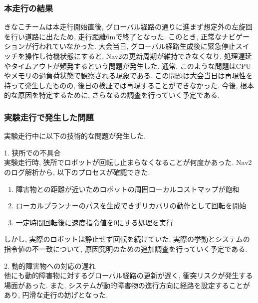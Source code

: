 \subsubsection{本走行の結果}
きなこチームは本走行開始直後, グローバル経路の通りに進まず想定外の左旋回を行い道路に出たため, 走行距離6mで終了となった. 
このとき, 正常なナビゲーションが行われていなかった. 
大会当日, グローバル経路生成後に緊急停止スイッチを操作し待機状態にすると, Nav2の更新周期が維持できなくなり, 処理遅延やタイムアウトが頻発するという問題が発生した. 
通常, このような問題はCPUやメモリの過負荷状態で観察される現象である. 
この問題は大会当日は再現性を持って発生したものの, 後日の検証では再現することができなかった. 
今後, 根本的な原因を特定するために, さらなるの調査を行っていく予定である. 

\subsubsection{実験走行で発生した問題}
実験走行中に以下の技術的な問題が発生した. 

1. 狭所での不具合\\
実験走行時, 狭所でロボットが回転し止まらなくなることが何度かあった. 
Nav2のログ解析から, 以下のプロセスが確認できた. 

\begin{enumerate}
  \item 障害物との距離が近いためロボットの周囲ローカルコストマップが飽和
  \item ローカルプランナーのパスを生成できずリカバリの動作として回転を開始
  \item  一定時間回転後に速度指令値を0にする処理を実行
\end{enumerate}

しかし, 実際のロボットは静止せず回転を続けていた. 
実際の挙動とシステムの指令値の不一致について, 原因究明のための追加調査を行っていく予定である. 

2. 動的障害物への対応の遅れ\\
他にも動的障害物に対するグローバル経路の更新が遅く, 衝突リスクが発生する場面があった. 
また, システムが動的障害物の進行方向に経路を設定することがあり, 円滑な走行の妨げとなった. 